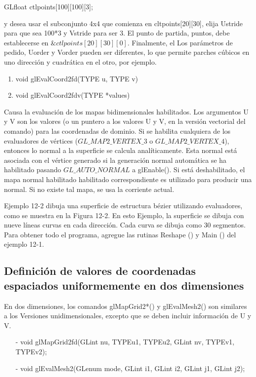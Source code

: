 GLfloat ctlpoints[100][100][3];

y desea usar el subconjunto 4x4 que comienza en cltpoints[20][30], elija Ustride para que sea 100*3 y
Vstride para ser 3. El punto de partida, puntos, debe establecerse en $\&ctlpoints[20][30][0]$. Finalmente, el
Los parámetros de pedido, Uorder y Vorder pueden ser diferentes, lo que permite parches cúbicos en uno
dirección y cuadrática en el otro, por ejemplo.


\begin{enumerate}
    \item void glEvalCoord2{fd}(TYPE u, TYPE v)
    \item void glEvalCoord2{fd}v(TYPE *values)
\end{enumerate}
 
 
Causa la evaluación de los mapas bidimensionales habilitados. Los argumentos U y V son los valores
(o un puntero a los valores U y V, en la versión vectorial del comando) para las coordenadas de dominio.
Si se habilita cualquiera de los evaluadores de vértices ($ GL\_MAP2\_VERTEX\_3 $ o $ GL\_MAP2\_VERTEX\_4 $),
entonces lo normal a la superficie se calcula analíticamente. Esta normal está asociada con el
vértice generado si la generación normal automática se ha habilitado pasando
$GL\_AUTO\_NORMAL$ a glEnable(). Si está deshabilitado, el mapa normal habilitado habilitado correspondiente es
utilizado para producir una normal. Si no existe tal mapa, se usa la corriente actual.

Ejemplo 12-2 dibuja una superficie de estructura bézier utilizando evaluadores, como se muestra en la Figura 12-2. En esto
Ejemplo, la superficie se dibuja con nueve líneas curvas en cada dirección. Cada curva se dibuja como 30
segmentos. Para obtener todo el programa, agregue las rutinas Reshape () y Main () del ejemplo 12-1.



\subsection{Definición de valores de coordenadas espaciados uniformemente en dos dimensiones}

En dos dimensiones, los comandos glMapGrid2*() y glEvalMesh2() son similares a los
Versiones unidimensionales, excepto que se deben incluir información de U y V.

\begin{enumerate}
    \item[-] void glMapGrid2{fd}(GLint nu, TYPEu1, TYPEu2,
    GLint nv, TYPEv1, TYPEv2);
    \item[-] void glEvalMesh2(GLenum mode, GLint i1, GLint i2, GLint j1, GLint j2);
\end{enumerate}
 

